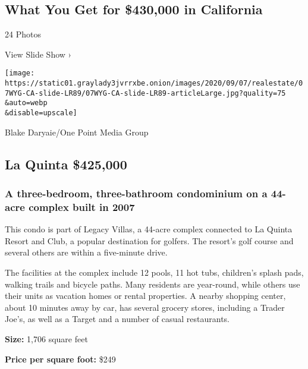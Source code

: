 \href{https://www.nytimes3xbfgragh.onion/slideshow/2020/09/07/realestate/what-you-get-for-430000-in-california.html}{}

\hypertarget{what-you-get-for-430000-in-california}{%
\subsection{What You Get for \$430,000 in
California}\label{what-you-get-for-430000-in-california}}

24 Photos

View Slide Show ›

\texttt{[image: https://static01.graylady3jvrrxbe.onion/images/2020/09/07/realestate/07WYG-CA-slide-LR89/07WYG-CA-slide-LR89-articleLarge.jpg?quality=75\\\&auto=webp\\\&disable=upscale]}

Blake Daryaie/One Point Media Group

\hypertarget{la-quinta--425000}{%
\subsection{La Quinta \textbar{} \$425,000}\label{la-quinta--425000}}

\hypertarget{a-three-bedroom-three-bathroom-condominium-on-a-44-acre-complex-built-in-2007}{%
\subsubsection{\texorpdfstring{\textbf{A three-bedroom, three-bathroom
condominium on a 44-acre complex built in
2007}}{A three-bedroom, three-bathroom condominium on a 44-acre complex built in 2007}}\label{a-three-bedroom-three-bathroom-condominium-on-a-44-acre-complex-built-in-2007}}

This condo is part of Legacy Villas, a 44-acre complex connected to La
Quinta Resort and Club, a popular destination for golfers. The resort's
golf course and several others are within a five-minute drive.

The facilities at the complex include 12 pools, 11 hot tubs, children's
splash pads, walking trails and bicycle paths. Many residents are
year-round, while others use their units as vacation homes or rental
properties. A nearby shopping center, about 10 minutes away by car, has
several grocery stores, including a Trader Joe's, as well as a Target
and a number of casual restaurants.

\textbf{Size:} 1,706 square feet

\textbf{Price per square foot:} \$249

